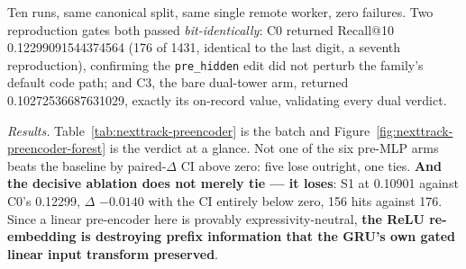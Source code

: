 \documentclass[11pt]{article}
\begin{document}
Ten runs, same canonical split, same single remote worker, zero failures. Two
reproduction gates both passed \emph{bit-identically}: C0 returned Recall@10
\num{0.12299091544374564} (\num{176} of \num{1431}, identical to the last digit,
a seventh reproduction), confirming the \texttt{pre\_hidden} edit did not perturb
the family's default code path; and C3, the bare dual-tower arm, returned
\num{0.10272536687631029}, exactly its on-record value, validating every dual
verdict.

\emph{Results.} Table~\ref{tab:nexttrack-preencoder} is the batch and
Figure~\ref{fig:nexttrack-preencoder-forest} is the verdict at a glance. Not one
of the six pre-MLP arms beats the baseline by paired-$\Delta$ CI above zero:
five lose outright, one ties. \textbf{And the decisive ablation does not merely
tie --- it loses}: S1 at \num{0.10901} against C0's \num{0.12299}, $\Delta$
$-\num{0.0140}$ with the CI entirely below zero, \num{156} hits against
\num{176}. Since a linear pre-encoder here is provably expressivity-neutral,
\textbf{the ReLU re-embedding is destroying prefix information that the GRU's own
gated linear input transform preserved}.
\end{document}
